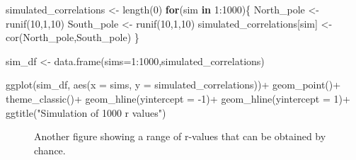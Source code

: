 \documentclass[
  letterpaper,
  DIV=11,
  numbers=noendperiod]{scrreprt}
\newenvironment{Shaded}{\begin{snugshade}}{\end{snugshade}}
\newcommand{\AttributeTok}[1]{\textcolor[rgb]{0.40,0.45,0.13}{#1}}
\newcommand{\ControlFlowTok}[1]{\textcolor[rgb]{0.00,0.23,0.31}{\textbf{#1}}}
\newcommand{\DecValTok}[1]{\textcolor[rgb]{0.68,0.00,0.00}{#1}}
\newcommand{\FunctionTok}[1]{\textcolor[rgb]{0.28,0.35,0.67}{#1}}
\newcommand{\NormalTok}[1]{\textcolor[rgb]{0.00,0.23,0.31}{#1}}
\newcommand{\OtherTok}[1]{\textcolor[rgb]{0.00,0.23,0.31}{#1}}
\newcommand{\SpecialCharTok}[1]{\textcolor[rgb]{0.37,0.37,0.37}{#1}}
\newcommand{\StringTok}[1]{\textcolor[rgb]{0.13,0.47,0.30}{#1}}
\begin{document}
\begin{Shaded}
\begin{Highlighting}[]
\NormalTok{simulated\_correlations }\OtherTok{\textless{}{-}} \FunctionTok{length}\NormalTok{(}\DecValTok{0}\NormalTok{)}
\ControlFlowTok{for}\NormalTok{(sim }\ControlFlowTok{in} \DecValTok{1}\SpecialCharTok{:}\DecValTok{1000}\NormalTok{)\{}
\NormalTok{  North\_pole }\OtherTok{\textless{}{-}} \FunctionTok{runif}\NormalTok{(}\DecValTok{10}\NormalTok{,}\DecValTok{1}\NormalTok{,}\DecValTok{10}\NormalTok{)}
\NormalTok{  South\_pole }\OtherTok{\textless{}{-}} \FunctionTok{runif}\NormalTok{(}\DecValTok{10}\NormalTok{,}\DecValTok{1}\NormalTok{,}\DecValTok{10}\NormalTok{)}
\NormalTok{  simulated\_correlations[sim] }\OtherTok{\textless{}{-}} \FunctionTok{cor}\NormalTok{(North\_pole,South\_pole)}
\NormalTok{\}}

\NormalTok{sim\_df }\OtherTok{\textless{}{-}} \FunctionTok{data.frame}\NormalTok{(}\AttributeTok{sims=}\DecValTok{1}\SpecialCharTok{:}\DecValTok{1000}\NormalTok{,simulated\_correlations)}

\FunctionTok{ggplot}\NormalTok{(sim\_df, }\FunctionTok{aes}\NormalTok{(}\AttributeTok{x =}\NormalTok{ sims, }\AttributeTok{y =}\NormalTok{ simulated\_correlations))}\SpecialCharTok{+}
  \FunctionTok{geom\_point}\NormalTok{()}\SpecialCharTok{+}
  \FunctionTok{theme\_classic}\NormalTok{()}\SpecialCharTok{+}
  \FunctionTok{geom\_hline}\NormalTok{(}\AttributeTok{yintercept =} \SpecialCharTok{{-}}\DecValTok{1}\NormalTok{)}\SpecialCharTok{+}
  \FunctionTok{geom\_hline}\NormalTok{(}\AttributeTok{yintercept =} \DecValTok{1}\NormalTok{)}\SpecialCharTok{+}
  \FunctionTok{ggtitle}\NormalTok{(}\StringTok{"Simulation of 1000 r values"}\NormalTok{)}
\end{Highlighting}
\end{Shaded}

\begin{figure}[H]


\caption{\label{fig-3anotherthousand}Another figure showing a range of
r-values that can be obtained by chance.}

\end{figure}%
\end{document}
